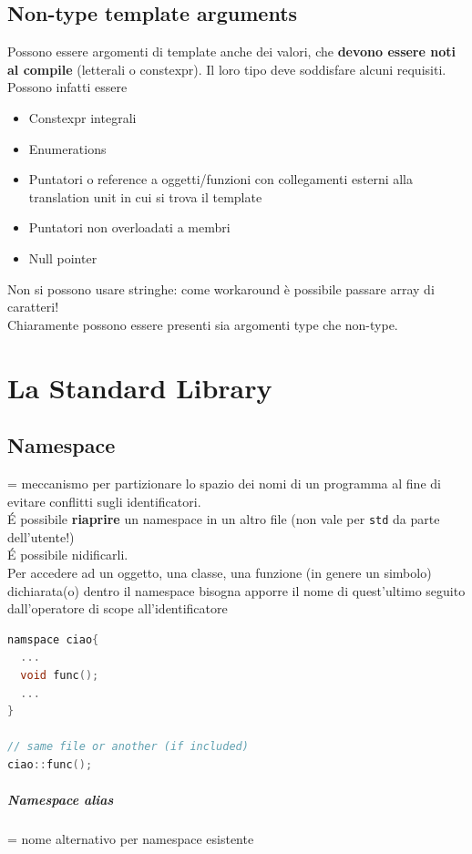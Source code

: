 \documentclass[10pt, oneside]{book}
\begin{document}
\section{Non-type template arguments}
Possono essere argomenti di template anche dei valori, che \textbf{devono essere noti al compile} (letterali o constexpr). Il loro tipo deve soddisfare alcuni requisiti. Possono infatti essere
\begin{itemize}
\item Constexpr integrali
\item Enumerations
\item Puntatori o reference a oggetti/funzioni con collegamenti esterni alla translation unit in cui si trova il template
\item Puntatori non overloadati a membri
\item Null pointer
\end{itemize}
Non si possono usare stringhe: come workaround è possibile passare array di caratteri!\\
Chiaramente possono essere presenti sia argomenti type che non-type.

\chapter{La Standard Library}

\section{Namespace}
= meccanismo per partizionare lo spazio dei nomi di un programma al fine di evitare conflitti sugli identificatori.\\
\'E possibile \textbf{riaprire} un namespace in un altro file (non vale per \texttt{std} da parte dell'utente!)\\
\'E possibile nidificarli.\\
Per accedere ad un oggetto, una classe, una funzione (in genere un simbolo) dichiarata(o) dentro il namespace bisogna apporre il nome di quest'ultimo seguito dall'operatore di scope all'identificatore
\begin{lstlisting}[language=C++]
namspace ciao{
  ...
  void func();
  ...
}

// same file or another (if included)
ciao::func();
\end{lstlisting}

\paragraph{Namespace alias} = nome alternativo per namespace esistente
\end{document}
